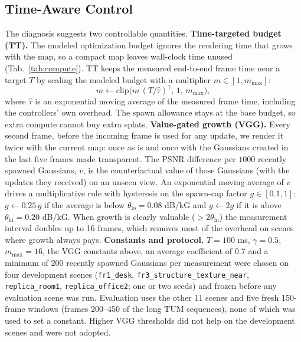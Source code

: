 \subsection{Time-Aware Control}
\label{sec:oldmethod}
The diagnosis suggests two controllable quantities. \textbf{Time-targeted budget (TT).} The modeled optimization budget ignores the rendering time that grows with the map, so a compact map leaves wall-clock time unused (Tab.~\ref{tab:compute}). TT keeps the measured end-to-end frame time near a target $T$ by scaling the modeled budget with a multiplier $m\in[1,m_{\max}]$:
\begin{equation}
m \leftarrow \mathrm{clip}\big(m\,(T/\hat\tau)^{\gamma},\,1,\,m_{\max}\big),
\end{equation}
where $\hat\tau$ is an exponential moving average of the measured frame time, including the controllers' own overhead. The spawn allowance stays at the base budget, so extra compute cannot buy extra splats.
\textbf{Value-gated growth (VGG).} Every second frame, before the incoming frame is used for any update, we render it twice with the current map: once as is and once with the Gaussians created in the last five frames made transparent. The PSNR difference per $1000$ recently spawned Gaussians, $v$, is the counterfactual value of those Gaussians (with the updates they received) on an unseen view. An exponential moving average of $v$ drives a multiplicative rule with hysteresis on the spawn-cap factor $g\in[0.1,1]$: $g\leftarrow 0.25\,g$ if the average is below $\theta_{\mathrm{lo}}=0.08$ dB/kG and $g\leftarrow 2g$ if it is above $\theta_{\mathrm{hi}}=0.20$ dB/kG. When growth is clearly valuable ($>2\theta_{\mathrm{hi}}$) the measurement interval doubles up to 16 frames, which removes most of the overhead on scenes where growth always pays.
\textbf{Constants and protocol.} $T=100$ ms, $\gamma=0.5$, $m_{\max}=16$, the VGG constants above, an average coefficient of $0.7$ and a minimum of $200$ recently spawned Gaussians per measurement were chosen on four development scenes (\texttt{fr1\_desk}, \texttt{fr3\_structure\_texture\_near}, \texttt{replica\_room1}, \texttt{replica\_office2}; one or two seeds) and frozen before any evaluation scene was run. Evaluation uses the other 11 scenes and five fresh 150-frame windows (frames 200--450 of the long TUM sequences), none of which was used to set a constant. Higher VGG thresholds did not help on the development scenes and were not adopted.

